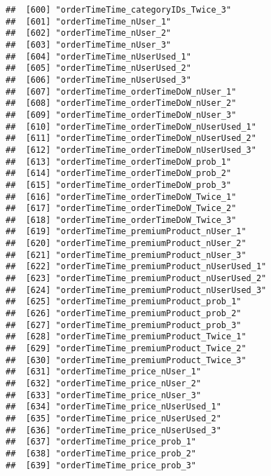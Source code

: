 \documentclass[10pt]{report}
\begin{document}
\begin{verbatim}
##  [600] "orderTimeTime_categoryIDs_Twice_3"                    
##  [601] "orderTimeTime_nUser_1"                                
##  [602] "orderTimeTime_nUser_2"                                
##  [603] "orderTimeTime_nUser_3"                                
##  [604] "orderTimeTime_nUserUsed_1"                            
##  [605] "orderTimeTime_nUserUsed_2"                            
##  [606] "orderTimeTime_nUserUsed_3"                            
##  [607] "orderTimeTime_orderTimeDoW_nUser_1"                   
##  [608] "orderTimeTime_orderTimeDoW_nUser_2"                   
##  [609] "orderTimeTime_orderTimeDoW_nUser_3"                   
##  [610] "orderTimeTime_orderTimeDoW_nUserUsed_1"               
##  [611] "orderTimeTime_orderTimeDoW_nUserUsed_2"               
##  [612] "orderTimeTime_orderTimeDoW_nUserUsed_3"               
##  [613] "orderTimeTime_orderTimeDoW_prob_1"                    
##  [614] "orderTimeTime_orderTimeDoW_prob_2"                    
##  [615] "orderTimeTime_orderTimeDoW_prob_3"                    
##  [616] "orderTimeTime_orderTimeDoW_Twice_1"                   
##  [617] "orderTimeTime_orderTimeDoW_Twice_2"                   
##  [618] "orderTimeTime_orderTimeDoW_Twice_3"                   
##  [619] "orderTimeTime_premiumProduct_nUser_1"                 
##  [620] "orderTimeTime_premiumProduct_nUser_2"                 
##  [621] "orderTimeTime_premiumProduct_nUser_3"                 
##  [622] "orderTimeTime_premiumProduct_nUserUsed_1"             
##  [623] "orderTimeTime_premiumProduct_nUserUsed_2"             
##  [624] "orderTimeTime_premiumProduct_nUserUsed_3"             
##  [625] "orderTimeTime_premiumProduct_prob_1"                  
##  [626] "orderTimeTime_premiumProduct_prob_2"                  
##  [627] "orderTimeTime_premiumProduct_prob_3"                  
##  [628] "orderTimeTime_premiumProduct_Twice_1"                 
##  [629] "orderTimeTime_premiumProduct_Twice_2"                 
##  [630] "orderTimeTime_premiumProduct_Twice_3"                 
##  [631] "orderTimeTime_price_nUser_1"                          
##  [632] "orderTimeTime_price_nUser_2"                          
##  [633] "orderTimeTime_price_nUser_3"                          
##  [634] "orderTimeTime_price_nUserUsed_1"                      
##  [635] "orderTimeTime_price_nUserUsed_2"                      
##  [636] "orderTimeTime_price_nUserUsed_3"                      
##  [637] "orderTimeTime_price_prob_1"                           
##  [638] "orderTimeTime_price_prob_2"                           
##  [639] "orderTimeTime_price_prob_3"                           

\end{verbatim}
\end{document}
